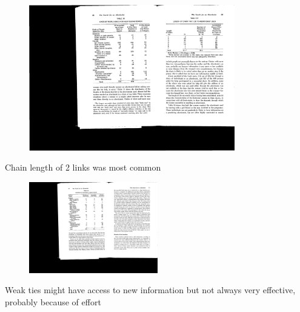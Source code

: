 \documentclass[aspectratio=169]{beamer}
\begin{document}
\begin{frame}

\begin{figure}
\center
\includegraphics[width = 0.8\textwidth]{figures/lee_search_1969_tab17}
\end{figure}

\pause

Chain length of 2 links was most common


\end{frame}
\begin{frame}

\begin{figure}
\center
\includegraphics[width = 0.5\textwidth]{figures/lee_search_1969_tab18}
\end{figure}

Weak ties might have access to new information but not always very effective, probably because of effort


\end{frame}
\end{document}
